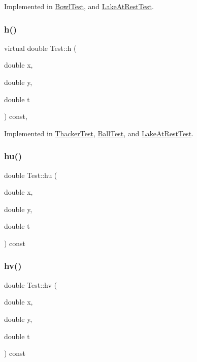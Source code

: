 Implemented in \hyperlink{classBowlTest_af8bd1eab2a63aa1a836424a587424c7e}{Bowl\+Test}, and \hyperlink{classLakeAtRestTest_a15491ec847ab6b11c9d15ac670ebf350}{Lake\+At\+Rest\+Test}.

\mbox{\label{classTest_a44ddc98e99388649978d7fb0c8173a9f}} 
\subsubsection{\texorpdfstring{h()}{h()}}
{\footnotesize\ttfamily virtual double Test\+::h (\begin{DoxyParamCaption}\item[{double}]{x,  }\item[{double}]{y,  }\item[{double}]{t }\end{DoxyParamCaption}) const\hspace{0.3cm}{\ttfamily [inline]}, {}}



Implemented in \hyperlink{classThackerTest_a55163711b089d6577452f24add0bb291}{Thacker\+Test}, \hyperlink{classBallTest_a54b33ed14108d7c5c007004ffefda374}{Ball\+Test}, and \hyperlink{classLakeAtRestTest_acba50afd11751c9557b639e84e895f41}{Lake\+At\+Rest\+Test}.

\mbox{\label{classTest_a2c4d70064a7362c32cd448da297f96e2}} 
\subsubsection{\texorpdfstring{hu()}{hu()}}
{\footnotesize\ttfamily double Test\+::hu (\begin{DoxyParamCaption}\item[{double}]{x,  }\item[{double}]{y,  }\item[{double}]{t }\end{DoxyParamCaption}) const\hspace{0.3cm}{\ttfamily [inline]}}

\mbox{\label{classTest_ab46622c3a857f2b905b2a309115b1724}} 
\subsubsection{\texorpdfstring{hv()}{hv()}}
{\footnotesize\ttfamily double Test\+::hv (\begin{DoxyParamCaption}\item[{double}]{x,  }\item[{double}]{y,  }\item[{double}]{t }\end{DoxyParamCaption}) const\hspace{0.3cm}{\ttfamily [inline]}}

